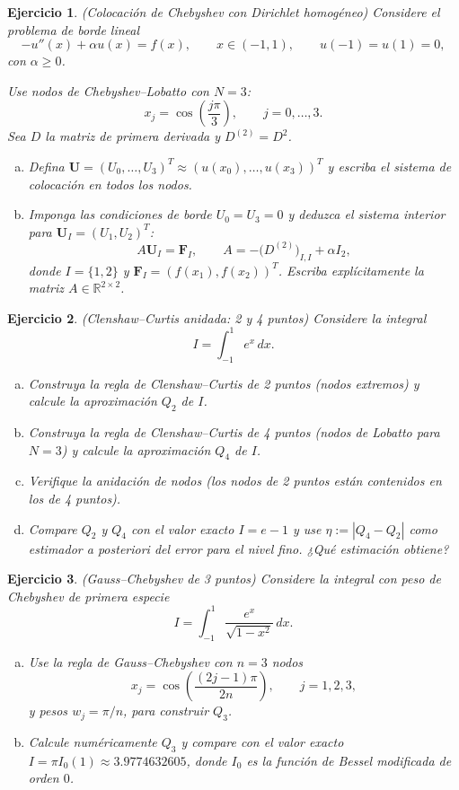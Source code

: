 \documentclass[12pt]{article}
\newtheorem{exercise}{Ejercicio}
\newcommand{\bej}{\begin{exercise}\rm}
\newcommand{\fej}{\end{exercise}}
\newcommand{\R}{\mathbb{R}}
\begin{document}
\bej (Colocación de Chebyshev con Dirichlet homogéneo)
Considere el problema de borde lineal
\[
-u''(x)+\alpha u(x)=f(x),\qquad x\in(-1,1),
\qquad
u(-1)=u(1)=0,
\]
con $\alpha\ge 0$.

Use nodos de Chebyshev--Lobatto con $N=3$:
\[
x_j=\cos\left(\frac{j\pi}{3}\right),\qquad j=0,\dots,3.
\]
Sea $D$ la matriz de primera derivada y $D^{(2)}=D^2$.

\begin{enumerate}[(a)]
    \item Defina $\mathbf U=(U_0,\dots,U_3)^T\approx (u(x_0),\dots,u(x_3))^T$ y escriba el sistema de colocación en todos los nodos.
    \item Imponga las condiciones de borde $U_0=U_3=0$ y deduzca el sistema interior para $\mathbf U_I=(U_1,U_2)^T$:
    \[
    A\mathbf U_I=\mathbf F_I,
    \qquad
    A=-\big(D^{(2)}\big)_{I,I}+\alpha I_2,
    \]
    donde $I=\{1,2\}$ y $\mathbf F_I=(f(x_1),f(x_2))^T$.
    Escriba explícitamente la matriz $A\in\R^{2\times 2}$.
\end{enumerate}
\fej


\bej (Clenshaw--Curtis anidada: 2 y 4 puntos)
Considere la integral
\[
I=\int_{-1}^1 e^x\,dx.
\]
\begin{enumerate}[(a)]
    \item Construya la regla de Clenshaw--Curtis de 2 puntos (nodos extremos) y calcule la aproximación $Q_2$ de $I$.
    \item Construya la regla de Clenshaw--Curtis de 4 puntos (nodos de Lobatto para $N=3$) y calcule la aproximación $Q_4$ de $I$.
    \item Verifique la anidación de nodos (los nodos de 2 puntos están contenidos en los de 4 puntos).
    \item Compare $Q_2$ y $Q_4$ con el valor exacto $I=e-1$ y use $\eta:=|Q_4-Q_2|$ como estimador a posteriori del error para el nivel fino. ¿Qué estimación obtiene?
\end{enumerate}
\fej

\bej (Gauss--Chebyshev de 3 puntos)
Considere la integral con peso de Chebyshev de primera especie
\[
I=\int_{-1}^1\frac{e^x}{\sqrt{1-x^2}}\,dx.
\]
\begin{enumerate}[(a)]
    \item Use la regla de Gauss--Chebyshev con $n=3$ nodos
    \[
    x_j=\cos\left(\frac{(2j-1)\pi}{2n}\right),\qquad j=1,2,3,
    \]
    y pesos $w_j=\pi/n$, para construir $Q_3$.
    \item Calcule numéricamente $Q_3$ y compare con el valor exacto $I=\pi I_0(1) \approx 3.9774632605$, donde $I_0$ es la función de Bessel modificada de orden $0$.
\end{enumerate}
\fej
\end{document}
